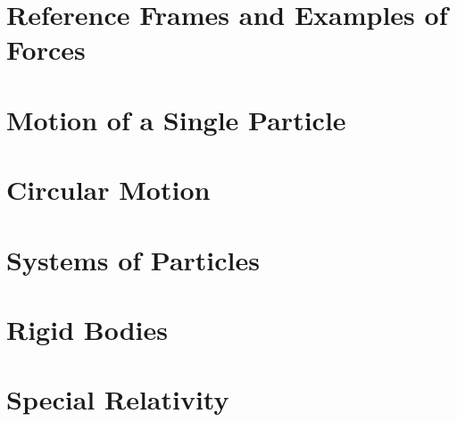 \documentclass[british,11pt,a4paper]{report}
\begin{document}
\maketitle
\tableofcontents
\chapter{Reference Frames and Examples of Forces}

\chapter{Motion of a Single Particle}
\chapter{Circular Motion}
\chapter{Systems of Particles}
\chapter{Rigid Bodies}
\chapter{Special Relativity}
\end{document}
